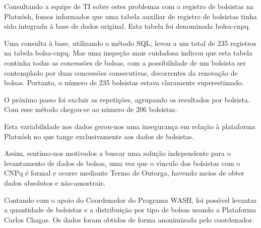 \documentclass[
12pt,		%
openright,	%
twoside,  %
a4paper,			%
chapter=TITLE,		%
english,			%
french,				%
spanish,			%
brazil				%
]{USPSC-classe/USPSC}
\begin{document}
Consultando a equipe de TI sobre estes problemas com o registro de bolsistas na Platu\'osh, fomos informados que uma tabela auxiliar de registro de bolsistas tinha sido integrada \`a base de dados original. Esta tabela foi denominada \textquotedbl bolsa-cnpq\textquotedbl .









Uma consulta \`a base, utilizando o m\'etodo SQL, levou a um total de 235 registros na tabela \textquotedbl bolsa-cnpq\textquotedbl . Mas uma inspe\c{c}\~ao mais cuidadosa indicou que esta tabela continha todas as concess\~oes de bolsas, com a possibilidade de um bolsista ser contemplado por duas concess\~oes consecutivas, decorrentes da renova\c{c}\~ao de bolsas. Portanto, o n\'umero de 235 bolsistas estava claramente superestimado.









O pr\'oximo passo foi excluir as repeti\c{c}\~oes, agrupando os resultados por bolsista. Com esse m\'etodo chegou-se ao n\'umero de 206 bolsistas.









Esta variabilidade nos dados gerou-nos uma inseguran\c{c}a em rela\c{c}\~ao \`a plataforma Platu\'osh no que tange exclusivamente aos dados de bolsistas.









Assim, sentimo-nos motivados a buscar uma solu\c{c}\~ao independente para o levantamento de dados de bolsas, uma vez que o v\'{\i}nculo dos bolsistas com o CNPq \'e formal e ocorre mediante Termo de Outorga, havendo meios de obter dados absolutos e n\~ao-amostrais.









Contando com o apoio do Coordenador do Programa WASH, foi poss\'{\i}vel levantar a quantidade de bolsistas e a distribui\c{c}\~ao por tipo de bolsas usando a Plataforma Carlos Chagas. Os dados foram obtidos de forma anonimizada pelo coordenador.
\end{document}
